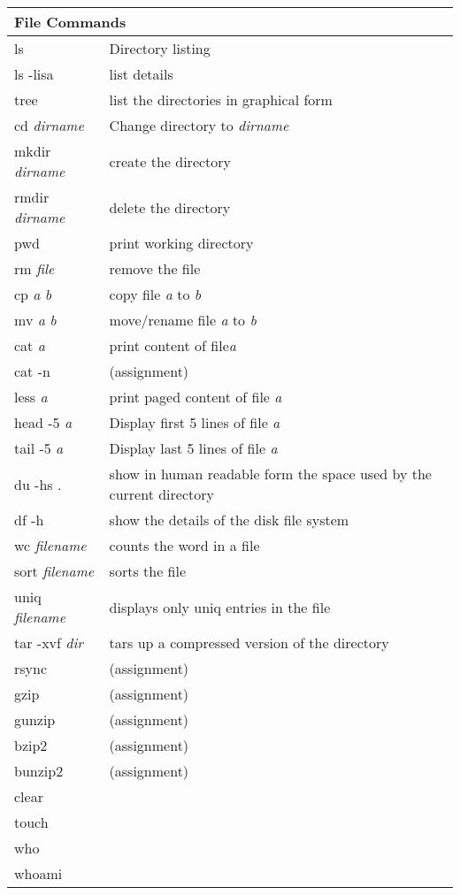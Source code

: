 \begin{center}
\begin{longtable}{|p{4cm}|p{8cm}|}
  \hline
  \multicolumn{2}{|l|}{\cellcolor{blue!15} File Commands}\\
  \hline
  ls & Directory listing\\
  ls -lisa & list details \\
  tree & list the directories in graphical form \\
  cd \emph{dirname} & Change directory to \emph{dirname} \\
  mkdir \emph{dirname} & create the directory \\
  rmdir \emph{dirname} & delete the directory \\
  pwd & print working directory \\
  rm \emph{file} & remove the file \\
  cp \emph{a} \emph{b} & copy file \emph{a} to \emph{b} \\
  mv \emph{a} \emph{b} & move/rename file \emph{a} to \emph{b}\\
  cat \emph{a} & print content of file\emph{a}\\
  cat -n &  (assignment) \\
  less \emph{a} & print paged content of file \emph{a}\\
  head -5 \emph{a} & Display first 5 lines of file \emph{a}\\
  tail -5 \emph{a} & Display last 5 lines of file \emph{a}\\
  du -hs . & show in human readable form the space used by the current
             directory\\
  df -h & show the details of the disk file system \\
  wc \textit{filename}&  counts the word in a file \\
  sort \textit{filename} &  sorts the file \\
  uniq \textit{filename} &  displays only uniq entries in the file \\
  tar -xvf \textit{dir} &  tars up a compressed version of the directory \\
  rsync &  (assignment) \\
  gzip &  (assignment) \\
  gunzip &  (assignment) \\
  bzip2 &  (assignment) \\
  bunzip2 &  (assignment) \\
  clear & \\
  touch & \\
  who & \\
  whoami & \\

\end{longtable}
\end{center}
